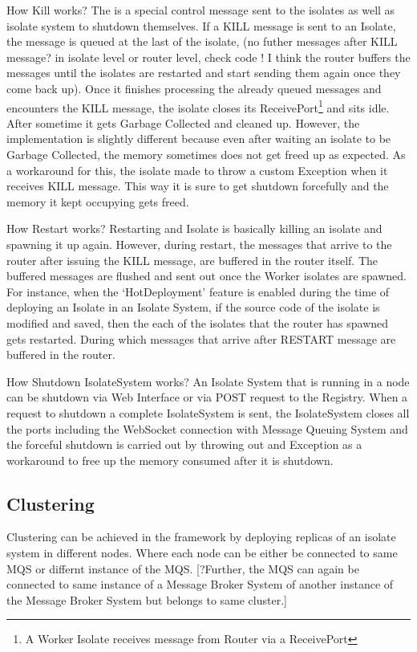 \begin{description}
    \item How Kill works?
    The is a special control message sent to the isolates as well as isolate system to shutdown themselves. If a KILL message is sent to an Isolate, the message is queued at the last of the isolate, (no futher messages after KILL message? in isolate level or router level, check code ! I think the router buffers the messages until the isolates are restarted and start sending them again once they come back up). Once it finishes processing the already queued messages and encounters the KILL message, the isolate closes its ReceivePort\footnote{A Worker Isolate receives message from Router via a ReceivePort} and sits idle. After sometime it gets Garbage Collected and cleaned up. However, the implementation is slightly different because even after waiting an isolate to be Garbage Collected, the memory sometimes does not get freed up as expected. As a workaround for this, the isolate made to throw a custom Exception when it receives KILL message. This way it is sure to get shutdown forcefully and the memory it kept occupying gets freed.

    \item How Restart works?
    Restarting and Isolate is basically killing an isolate and spawning it up again. However, during restart, the messages that arrive to the router after issuing the KILL message, are buffered in the router itself. The buffered messages are flushed and sent out once the Worker isolates are spawned. For instance, when the ‘HotDeployment’ feature is enabled during the time of deploying an Isolate in an Isolate System, if the source code of the isolate is modified and saved, then the each of the isolates that the router has spawned gets restarted. During which messages that arrive after RESTART message are buffered in the router.

    \item How Shutdown IsolateSystem works?
    An Isolate System that is running in a node can be shutdown via Web Interface or via POST request to the Registry. When a request to shutdown a complete IsolateSystem is sent, the IsolateSystem closes all the ports including the WebSocket connection with Message Queuing System and the forceful shutdown is carried out by throwing out and Exception as a workaround to free up the memory consumed after it is shutdown.

  \end{description}
\subsection{Clustering}
Clustering can be achieved in the framework by deploying replicas of an isolate system in different nodes. Where each node can be either be connected to same MQS or differnt instance of the MQS.
[?Further, the MQS can again be connected to same instance of a Message Broker System of another instance of the Message Broker System but belongs to same cluster.]

